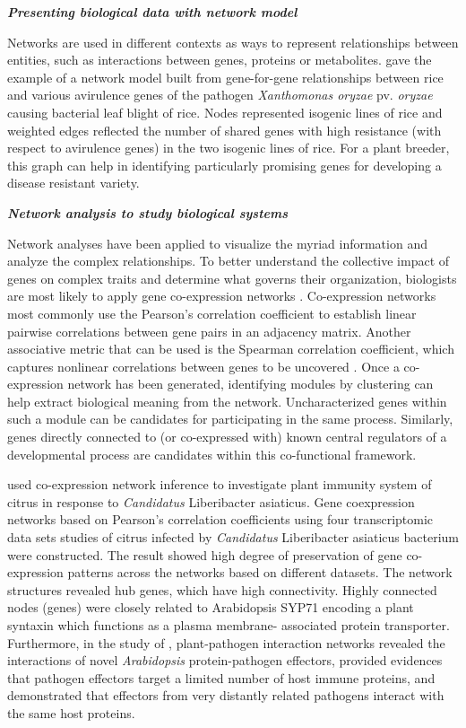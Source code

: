 \documentclass[12pt, oneside]{report}
\begin{document}
\textit{\textbf{Presenting biological data with network model}}

Networks are used in different contexts as ways to represent relationships between entities, such as interactions between genes, proteins or metabolites. \citet{wu2007gene} gave the example of a network model built from gene-for-gene relationships between rice and various avirulence genes of the pathogen \textit{Xanthomonas oryzae} pv. \textit{oryzae} causing bacterial leaf blight of rice. Nodes represented isogenic lines of rice and weighted edges reflected the number of shared genes with high resistance (with respect to avirulence genes) in the two isogenic lines of rice. For a plant breeder, this graph can help in identifying particularly promising genes for developing a disease resistant variety.


\textit{\textbf{Network analysis to study biological systems}}

Network analyses have been applied to visualize the myriad information and analyze the complex relationships. To better understand the collective impact of genes on complex traits and determine what governs their organization, biologists are most likely to apply gene co-expression networks \citep{usadel2009co}. Co-expression networks most commonly use the Pearson's correlation coefficient to establish linear pairwise correlations between gene pairs in an adjacency matrix. Another associative metric that can be used is the Spearman correlation coefficient, which captures nonlinear correlations between genes to be uncovered \citep{usadel2009co, horvath2011weighted}. Once a co-expression network has been generated, identifying modules by clustering can help extract biological meaning from the network. Uncharacterized genes within such a module can be candidates for participating in the same process. Similarly, genes directly connected to (or co-expressed with) known central regulators of a developmental process are candidates within this co-functional framework.

\citet{Zheng2013} used co-expression network inference to investigate plant immunity system of citrus in response to \textit{Candidatus} Liberibacter asiaticus. Gene coexpression networks based on Pearson's correlation coefficients using four transcriptomic data sets studies of citrus infected by \textit{Candidatus} Liberibacter asiaticus bacterium were constructed. The result showed high degree of preservation of gene co-expression patterns across the networks based on different datasets. The network structures revealed hub genes, which have high connectivity. Highly connected nodes (genes) were closely related to Arabidopsis SYP71 encoding a plant syntaxin which functions as a plasma membrane- associated protein transporter. Furthermore, in the study of \citet{mukhtar2011independently}, plant-pathogen interaction networks revealed the interactions of novel \textit{Arabidopsis} protein-pathogen effectors, provided evidences that pathogen effectors target a limited number of host immune proteins, and demonstrated that effectors from very distantly related pathogens interact with the same host proteins. 
\end{document}
